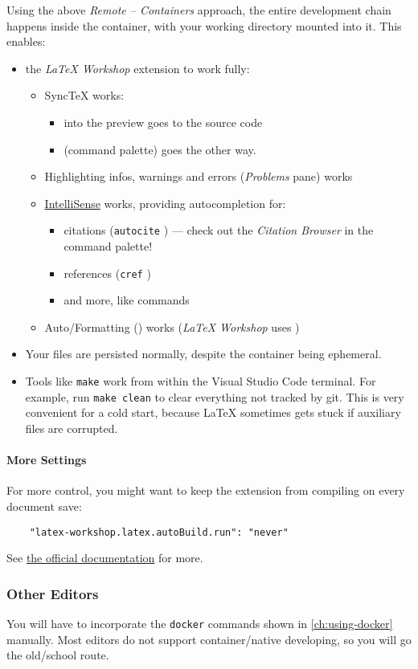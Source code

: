 Using the above \emph{Remote -- Containers} approach, the entire development chain happens inside the container, with your working directory mounted into it.
This enables:
\begin{itemize}
    \item the \emph{LaTeX Workshop} extension to work fully:
        \begin{itemize}
            \item SyncTeX works:
                \begin{itemize}
                    \item {} into the  preview goes to the source code
                    \item {} (command palette) goes the other way.
                \end{itemize}
            \item Highlighting infos, warnings and errors (\emph{Problems} pane) works
            \item \href{https://github.com/James-Yu/LaTeX-Workshop/wiki/Intellisense}{IntelliSense} works, providing autocompletion for:
                \begin{itemize}
                    \item citations (\texttt{autocite} ) --- check out the \emph{Citation Browser} in the command palette!
                    \item references (\texttt{cref} )
                    \item and more, like commands
                \end{itemize}
            \item Auto\-/Formatting () works (\emph{LaTeX Workshop} uses )
        \end{itemize}
    \item Your files are persisted normally, despite the container being ephemeral.
    \item Tools like \texttt{make} work from within the Visual Studio Code terminal.
        For example, run \texttt{make clean} to clear everything not tracked by git.
        This is very convenient for a cold start, because \LaTeX{} sometimes gets stuck if auxiliary files are corrupted.
\end{itemize}

\paragraph{More Settings}
For more control, you might want to keep the extension from compiling on every document save:
\begin{verbatim}
    "latex-workshop.latex.autoBuild.run": "never"
\end{verbatim}
See \href{https://github.com/James-Yu/LaTeX-Workshop/wiki/Compile#latex-recipes}{the official documentation} for more.

\subsubsection{Other Editors}

You will have to incorporate the \texttt{docker} commands shown in \cref{ch:using-docker} manually.
Most editors do not support container\-/native developing, so you will go the old\-/school route.
